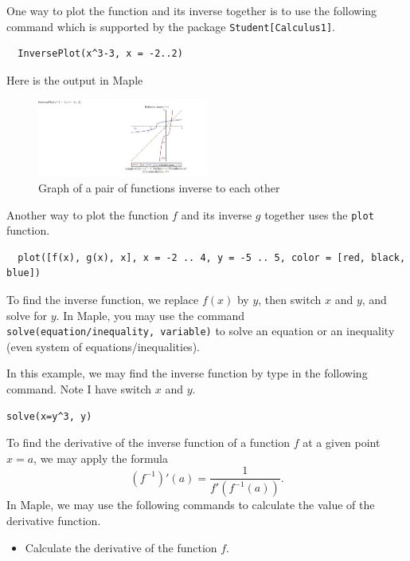 \documentclass[
  en,11pt,simple]{elegantbook}
\begin{document}
\begin{solution}
{}
One way to plot the function and its inverse together is to use the following command which is supported by the package \texttt{Student{[}Calculus1{]}}.

\begin{verbatim}
  InversePlot(x^3-3, x = -2..2)
\end{verbatim}

Here is the output in Maple

\begin{figure}
\centering
\includegraphics[width=0.5\textwidth,height=\textheight]{figs/InversePlot1.png}
\caption{Graph of a pair of functions inverse to each other}
\end{figure}

Another way to plot the function \(f\) and its inverse \(g\) together uses the \texttt{plot} function.

\begin{verbatim}
  plot([f(x), g(x), x], x = -2 .. 4, y = -5 .. 5, color = [red, black, blue])
\end{verbatim}

To find the inverse function, we replace \(f(x)\) by \(y\), then switch \(x\) and \(y\), and solve for \(y\). In Maple, you may use the command \texttt{solve(equation/inequality,\ variable)} to solve an equation or an inequality (even system of equations/inequalities).

In this example, we may find the inverse function by type in the following command. Note I have switch \(x\) and \(y\).

\begin{verbatim}
solve(x=y^3, y)
\end{verbatim}
\end{solution}

To find the derivative of the inverse function of a function \(f\) at a given point \(x=a\), we may apply the formula
\[(f^{-1})'(a)=\dfrac{1}{f'(f^{-1}(a))}.\]
In Maple, we may use the following commands to calculate the value of the derivative function.

\begin{itemize}

\item
  Calculate the derivative of the function \(f\).
\end{itemize}
\end{document}
